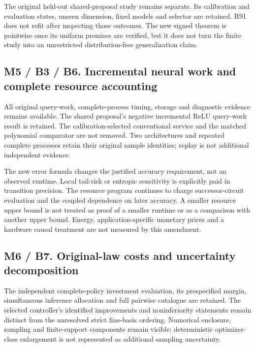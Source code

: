 The original held-out shared-proposal study remains separate. Its
calibration and evaluation states, unseen dimension, fixed models and
selector are retained. R91 does not refit after inspecting those
outcomes. The new signed theorem is pointwise once its uniform premises
are verified, but it does not turn the finite study into an unrestricted
distribution-free generalization claim.

\hypertarget{m5-b3-b6.-incremental-neural-work-and-complete-resource-accounting}{%
\subsection{M5 / B3 / B6. Incremental neural work and complete resource
accounting}\label{m5-b3-b6.-incremental-neural-work-and-complete-resource-accounting}}

All original query-work, complete-process timing, storage and diagnostic
evidence remains available. The shared proposal's negative incremental
ReLU query-work result is retained. The calibration-selected
conventional service and the matched polynomial comparator are not
removed. Two architectures and repeated complete processes retain their
original sample identities; replay is not additional independent
evidence.

The new error formula changes the justified accuracy requirement, not an
observed runtime. Local tail-risk or entropic sensitivity is explicitly
paid in transition precision. The resource program continues to charge
successor-circuit evaluation and the coupled dependence on later
accuracy. A smaller resource upper bound is not treated as proof of a
smaller runtime or as a comparison with another upper bound. Energy,
application-specific monetary prices and a hardware causal treatment are
not measured by this amendment.

\hypertarget{m6-b7.-original-law-costs-and-uncertainty-decomposition}{%
\subsection{M6 / B7. Original-law costs and uncertainty
decomposition}\label{m6-b7.-original-law-costs-and-uncertainty-decomposition}}

The independent complete-policy investment evaluation, its prespecified
margin, simultaneous inference allocation and full pairwise catalogue
are retained. The selected controller's identified improvements and
noninferiority statements remain distinct from the unresolved strict
fine-basis ordering. Numerical enclosure, sampling and finite-support
components remain visible; deterministic optimizer-class enlargement is
not represented as additional sampling uncertainty.

